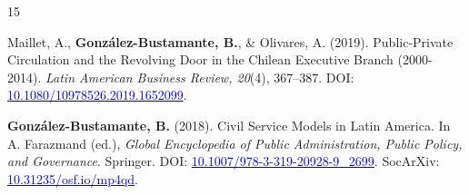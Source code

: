 \begin{publications}
\begin{benumerate}{15}
\item{Maillet, A., {\bfseries González-Bustamante, B.}, \& Olivares, A. (2019). Public-Private Circulation and the Revolving Door in the Chilean Executive Branch (2000-2014). {\itshape Latin American Business Review, 20}(4), 367--387. DOI: \href{https://doi.org/10.1080/10978526.2019.1652099}{\textcolor{blue}{10.1080/10978526.2019.1652099}}.}\vspace{1mm}


\item{{\bfseries González-Bustamante, B.} (2018). Civil Service Models in Latin America. In A. Farazmand (ed.), {\itshape Global Encyclopedia of Public Administration, Public Policy, and Governance}. Springer. DOI: \href{https://doi.org/10.1007/978-3-319-20928-9\_2699}{\textcolor{blue}{10.1007/978-3-319-20928-9\_2699}}. SocArXiv: \href{https://doi.org/10.31235/osf.io/mp4qd}{\textcolor{blue}{10.31235/osf.io/mp4qd}}.}\vspace{1mm} %


\end{benumerate}

\end{publications}


